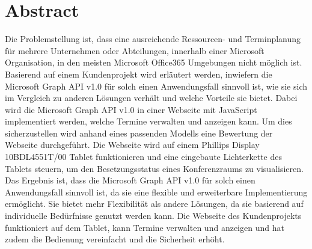 \section*{Abstract}\label{sec:Abstract}
Die Problemstellung ist, dass eine ausreichende Ressourcen- und Terminplanung für mehrere Unternehmen oder Abteilungen, innerhalb einer Microsoft Organisation, in den meisten Microsoft Office365 Umgebungen nicht möglich ist.
Basierend auf einem Kundenprojekt wird erläutert werden, inwiefern die Microsoft Graph API v1.0 für solch einen Anwendungsfall sinnvoll ist, wie sie sich im Vergleich zu anderen Lösungen verhält und welche Vorteile sie bietet.
Dabei wird die Microsoft Graph API v1.0 in einer Webseite mit JavaScript implementiert werden, welche Termine verwalten und anzeigen kann.
Um dies sicherzustellen wird anhand eines passenden Modells eine Bewertung der Webseite durchgeführt.
Die Webseite wird auf einem Phillips Display 10BDL4551T/00 Tablet funktionieren und eine eingebaute Lichterkette des Tablets steuern, um den Besetzungsstatus eines Konferenzraums zu visualisieren.
\newline
Das Ergebnis ist, dass die Microsoft Graph API v1.0 für solch einen Anwendungsfall sinnvoll ist, da sie eine flexible und erweiterbare Implementierung ermöglicht.
Sie bietet mehr Flexibilität als andere Lösungen, da sie basierend auf individuelle Bedürfnisse genutzt werden kann.
Die Webseite des Kundenprojekts funktioniert auf dem Tablet, kann Termine verwalten und anzeigen und hat zudem die Bedienung vereinfacht und die Sicherheit erhöht.
\newpage
